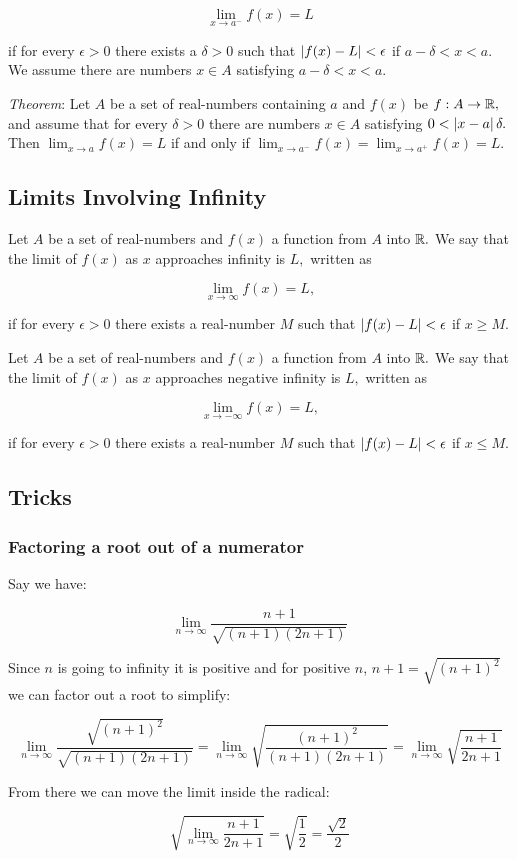 \documentclass{article}
\begin{document}
\[ \lim_{x \to a^-}{f(x)} = L \]

if for every $\epsilon > 0$ there exists a $\delta > 0$ such that $\left| f(x) - L \right| < \epsilon$ if $a - \delta < x < a.$ We assume there are numbers $x \in A$ satisfying $a - \delta < x < a.$

\emph{Theorem}: Let $A$ be a set of \@{real-numbers} containing $a$ and $f(x)$ be $f : A \to \mathbb{R},$ and assume that for every $\delta > 0$ there are numbers $x \in A$ satisfying $0 < \left| x - a \right| \delta.$ Then $\lim_{x \to a}{f(x)} = L$ if and only if $\lim_{x \to a^-}{f(x)} = \lim_{x \to a^+}{f(x)} = L.$

\subsection{Limits Involving Infinity}
Let $A$ be a set of \@{real-numbers} and $f(x)$ a function from $A$ into $\mathbb{R}.$ We say that the limit of $f(x)$ as $x$ approaches infinity is $L,$ written as

\[ \lim_{x \to \infty}{f(x)} = L, \]

if for every $\epsilon > 0$ there exists a \@{real-number} $M$ such that $\left| f(x) - L \right| < \epsilon$ if $x \geq M.$ 

Let $A$ be a set of \@{real-numbers} and $f(x)$ a function from $A$ into $\mathbb{R}.$ We say that the limit of $f(x)$ as $x$ approaches negative infinity is $L,$ written as

\[ \lim_{x \to - \infty}{f(x)} = L, \]

if for every $\epsilon > 0$ there exists a \@{real-number} $M$ such that $\left| f(x) - L \right| < \epsilon$ if $x \leq M.$ 
\subsection{Tricks}

\subsubsection{Factoring a root out of a numerator}

Say we have:

\[ \lim_{n \to \infty} \frac{n + 1}{\sqrt{(n + 1)(2n+1)}} \]

Since $n$ is going to infinity it is positive and for positive $n$, $n + 1 = \sqrt{(n+1)^2}$ we can factor out a root to simplify:

\[ \lim_{n \to \infty}  \frac{\sqrt{(n + 1)^2}}{\sqrt{(n + 1)(2n+1)}} =  \lim_{n \to \infty} \sqrt{\frac{(n + 1)^2}{(n + 1)(2n+1)}} =  \lim_{n \to \infty} \sqrt{\frac{n+1}{2n+1}} \]

From there we can move the limit inside the radical:

\[ \sqrt{\lim_{n \to \infty} \frac{n + 1}{2n + 1}} = \sqrt{\frac{1}{2}} = \frac{\sqrt{2}}{2} \]
\end{document}
